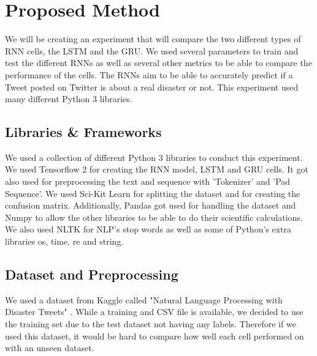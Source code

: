 \documentclass[a4paper,10pt]{article}
\begin{document}
\section{Proposed Method}
	We will be creating an experiment that will compare the two different types of RNN cells, the LSTM and the GRU. We used several parameters to train and test the different RNNs as well as several other metrics to be able to compare the performance of the cells. The RNNs aim to be able to accurately predict if a Tweet posted on Twitter is about a real disaster or not. This experiment used many different Python 3 libraries.

\subsection{Libraries \& Frameworks}
	We used a collection of different Python 3 libraries to conduct this experiment. We used Tensorflow 2 \cite{tensorflow} for creating the RNN model, LSTM and GRU cells. It got also used for preprocessing the text and sequence with 'Tokenizer' and 'Pad Sequence'. We used Sci-Kit Learn \cite{scikit-learn} for splitting the dataset and for creating the confusion matrix. Additionally, Pandas \cite{pandas} got used for handling the dataset and Numpy to allow the other libraries to be able to do their scientific calculations. We also used NLTK \cite{nltk} for NLP's stop words as well as some of Python's extra libraries os, time, re and string. 

\subsection{Dataset and Preprocessing}
	We used a dataset from Kaggle called "Natural Language Processing with Disaster Tweets" \cite{disater_kaggle}. While a training and CSV file is available, we decided to use the training set due to the test dataset not having any labels. Therefore if we used this dataset, it would be hard to compare how well each cell performed on with an unseen dataset.
\end{document}
